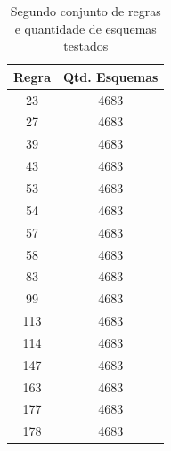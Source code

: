 \documentclass[a4paper,12pt]{ltxdoc}
\begin{document}

\break

\begin{center}
  \begin{longtable}{ | c | c | } 
  \caption{Segundo conjunto de regras e quantidade de esquemas testados}\\
    \hline
    Regra & Qtd. Esquemas     	\\\hline
    23 & 4683 \\\hline
    27 & 4683 \\\hline
    39 & 4683 \\\hline
    43 & 4683 \\\hline
    53 & 4683 \\\hline
    54 & 4683 \\\hline
    57 & 4683 \\\hline
    58 & 4683 \\\hline
    83 & 4683 \\\hline
    99 & 4683 \\\hline
    113 & 4683 \\\hline
    114 & 4683 \\\hline
    147 & 4683 \\\hline
    163 & 4683 \\\hline
    177 & 4683 \\\hline
    178 & 4683 \\\hline
  \end{longtable}
\end{center}
\end{document}
